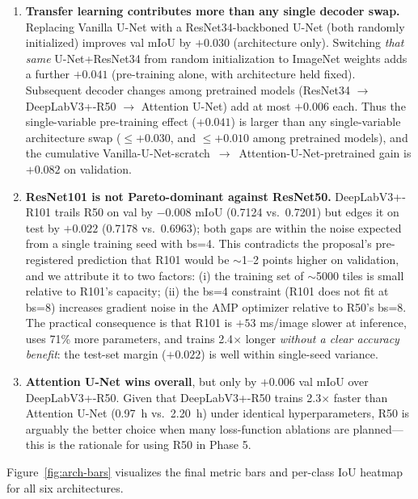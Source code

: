 \documentclass[conference,letterpaper,10pt]{IEEEtran}
\begin{document}
\begin{enumerate}
\item \textbf{Transfer learning contributes more than any single
      decoder swap.} Replacing Vanilla U-Net with a ResNet34-backboned
      U-Net (both randomly initialized) improves val mIoU by $+0.030$
      (architecture only). Switching \emph{that same} U-Net+ResNet34
      from random initialization to ImageNet weights adds a further
      $+0.041$ (pre-training alone, with architecture held fixed).
      Subsequent decoder changes among pretrained models
      (ResNet34 $\rightarrow$ DeepLabV3+-R50 $\rightarrow$ Attention U-Net)
      add at most $+0.006$ each. Thus the single-variable pre-training
      effect ($+0.041$) is larger than any single-variable architecture
      swap ($\le +0.030$, and $\le +0.010$ among pretrained models),
      and the cumulative Vanilla-U-Net-scratch~$\rightarrow$~Attention-U-Net-pretrained
      gain is $+0.082$ on validation.
\item \textbf{ResNet101 is not Pareto-dominant against ResNet50.}
      DeepLabV3+-R101 trails R50 on val by $-0.008$ mIoU (0.7124 vs.\
      0.7201) but edges it on test by $+0.022$ (0.7178 vs.\ 0.6963);
      both gaps are within the noise expected from a single training
      seed with bs=4. This contradicts the proposal's pre-registered
      prediction that R101 would be $\sim$1--2 points higher on
      validation, and we attribute it to two factors: (i) the training
      set of $\sim$5000 tiles is small relative to R101's capacity;
      (ii) the bs=4 constraint (R101 does not fit at bs=8) increases
      gradient noise in the AMP optimizer relative to R50's bs=8. The
      practical consequence is that R101 is $+53$ ms/image slower at
      inference, uses 71\% more parameters, and trains 2.4$\times$
      longer \emph{without a clear accuracy benefit}: the test-set
      margin ($+0.022$) is well within single-seed variance.
\item \textbf{Attention U-Net wins overall}, but only by $+0.006$ val
      mIoU over DeepLabV3+-R50. Given that DeepLabV3+-R50 trains
      2.3$\times$ faster than Attention U-Net (0.97~h vs.\ 2.20~h)
      under identical hyperparameters, R50 is arguably the better
      choice when many loss-function ablations are planned---this is
      the rationale for using R50 in Phase 5.
\end{enumerate}

Figure~\ref{fig:arch-bars} visualizes the final metric bars and
per-class IoU heatmap for all six architectures.
\end{document}
